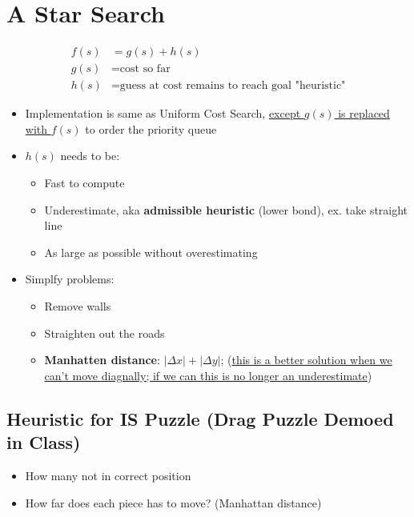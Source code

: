 \section{A Star Search}

  \begin{align*}
    f(s) &= g(s) + h(s) \\
    g(s) &= \text{cost so far} \\
    h(s) &= \text{guess at cost remains to reach goal "heuristic"}
  \end{align*}

  \begin{itemize}
    \item Implementation is same as Uniform Cost Search,
    \ul{except $ g(s) $ is replaced with $ f(s) $} to
    order the priority queue
    \item $ h(s) $ needs to be:
    \begin{itemize}
      \item Fast to compute
      \item Underestimate, aka \textbf{admissible heuristic} (lower bond),
      ex. take straight line
      \item As large as possible without overestimating
    \end{itemize}

    \item Simplfy problems:
    \begin{itemize}
      \item Remove walls
      \item Straighten out the roads
      \item \textbf{Manhatten distance}: $\left| \Delta x \right| + \left| \Delta y \right|$;
      (\ul{this is a better solution when we can't move diagnally; if we can this is no longer an underestimate})
    \end{itemize}
  \end{itemize}

  \subsection{Heuristic for IS Puzzle (Drag Puzzle Demoed in Class)}

    \begin{itemize}
      \item How many not in correct position
      \item How far does each piece has to move? (Manhattan distance)
    \end{itemize}

